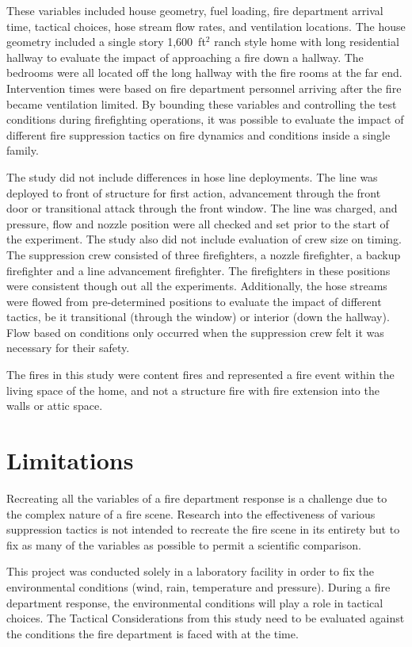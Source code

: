 \documentclass[12pt,oneside]{book}
\begin{document}
These variables included house geometry, fuel loading, fire department arrival time, tactical choices, hose stream flow rates, and ventilation locations. The house geometry included a single story 1,600~ft$^2$ ranch style home with long residential hallway to evaluate the impact of approaching a fire down a hallway. The bedrooms were all located off the long hallway with the fire rooms at the far end.  Intervention times were based on fire department personnel arriving after the fire became ventilation limited. By bounding these variables and controlling the test conditions during firefighting operations, it was possible to evaluate the impact of different fire suppression tactics on fire dynamics and conditions inside a single family.  

The study did not include differences in hose line deployments. The line was deployed to front of structure for first action, advancement through the front door or transitional attack through the front window. The line was charged, and pressure, flow and nozzle position were all checked and set prior to the start of the experiment. The study also did not include evaluation of crew size on timing. The suppression crew consisted of three firefighters, a nozzle firefighter, a backup firefighter and a line advancement firefighter. The firefighters in these positions were consistent though out all the experiments. Additionally, the hose streams were flowed from pre-determined positions to evaluate the impact of different tactics, be it transitional (through the window) or interior (down the hallway). Flow based on conditions only occurred when the suppression crew felt it was necessary for their safety. 

The fires in this study were content fires and represented a fire event within the living space of the home, and not a structure fire with fire extension into the walls or attic space.

\section{Limitations}
Recreating all the variables of a fire department response is a challenge due to the complex nature of a fire scene. Research into the effectiveness of various suppression tactics is not intended to recreate the fire scene in its entirety but to fix as many of the variables as possible to permit a scientific comparison. 

This project was conducted solely in a laboratory facility in order to fix the environmental conditions (wind, rain, temperature and pressure). During a fire department response, the environmental conditions will play a role in tactical choices. The Tactical Considerations from this study need to be evaluated against the conditions the fire department is faced with at the time. 
\end{document}
